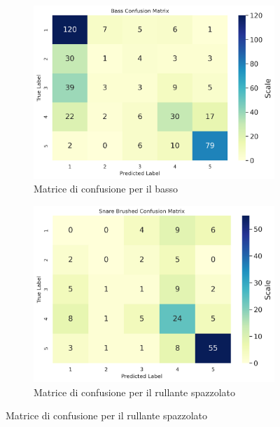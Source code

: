 \begin{figure}[h]
	\centering
	\begin{subfigure}{.5\linewidth}
		\includegraphics[width=\linewidth]{./immagini/second_classification/cb_cm.png} 
		\caption{Matrice di confusione per il basso}
		\label{fig:1a}
	\end{subfigure}\hfill
	\begin{subfigure}{.5\linewidth}
		\includegraphics[width=\linewidth]{./immagini/second_classification/sn_brushed_cm.png}
		\caption{Matrice di confusione per il rullante spazzolato}
		\label{fig:1b}
	\end{subfigure}
	

\end{figure}
